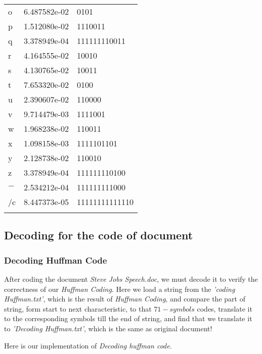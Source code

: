 \documentclass[12pt]{article} %
\numberwithin{equation}{section}
\def\cents{\hbox{\rm\rlap/c}}
\begin{document}
\begin{table}[!hptb]
\begin{minipage}{.5\linewidth}
\begin{tabular}{lcl}
o 		 &6.487582e-02 		 &0101\\
p 		 &1.512080e-02 		 &1110011\\
q 		 &3.378949e-04 		 &111111110011\\
r 		 &4.164555e-02 		 &10010\\
s 		 &4.130765e-02 		 &10011\\
t 		 &7.653320e-02 		 &0100\\
u 		 &2.390607e-02 		 &110000\\
v 		 &9.714479e-03 		 &1111001\\
w 		 &1.968238e-02 		 &110011\\
x 		 &1.098158e-03 		 &1111101101\\
y 		 &2.128738e-02 		 &110010\\
z 		 &3.378949e-04 		 &111111110100\\
$-$ 	 &2.534212e-04 		 &111111111000\\
\cents 	 &8.447373e-05 		 &11111111111110\\
\\ \hline
\end{tabular}
\end{minipage}
\end{table}

\subsection{Decoding for the code of document} %

\subsubsection{Decoding Huffman Code}

After coding the document \emph{Steve Jobs Speech.doc}, we must decode it to verify the correctness of our \emph{Huffman Coding}. Here we load a string from the \emph{'coding Huffman.txt'}, which is the result of \emph{Huffman Coding}, and compare the part of string, form start to next characteristic, to that $71-symbols$ codes, translate it to the corresponding symbols till the end of string, and find that we translate it to \emph{'Decoding Huffman.txt'}, which is the same as original document!

Here is our implementation of \emph{Decoding huffman code}.
\end{document}
